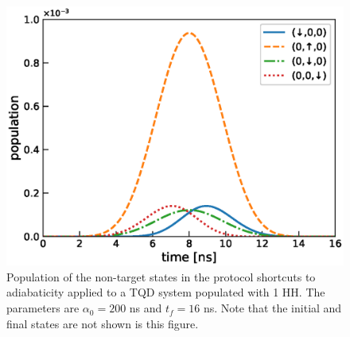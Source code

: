 \documentclass[a4paper,11pt]{article}
\begin{document}
\begin{figure}[!htbp]
	\centering
	\includegraphics[width=0.7\linewidth]{STA_TQD_Results_Amplified.eps}
	\caption{Population of the non-target states in the protocol shortcuts to adiabaticity applied to a TQD system populated with 1 HH. The parameters are $\alpha_0=200$ ns and $t_f=16$ ns. Note that the initial and final states are not shown is this figure.}
	\label{fig:STA_TQD_Results_Amplified}
\end{figure}
\end{document}
